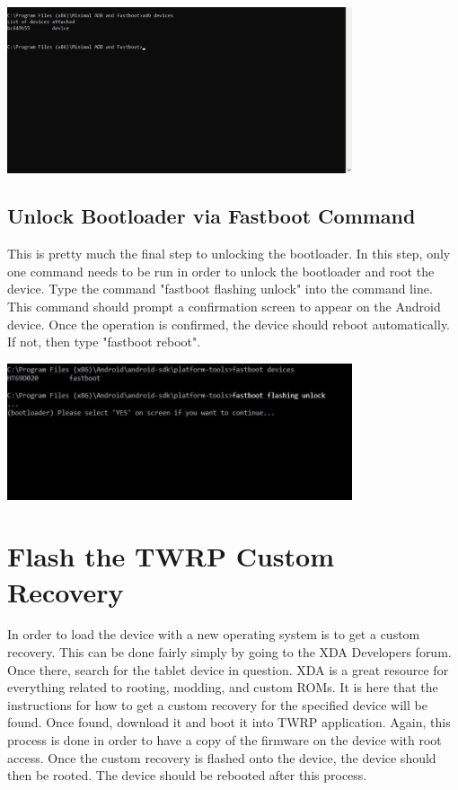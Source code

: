 \includegraphics[width=4in]{images/adbdevices}

\subsection{Unlock Bootloader via Fastboot Command}
This is pretty much the final step to unlocking the bootloader. In this step, only one command needs to be run in order to unlock the bootloader and root the device. 
Type the command "fastboot flashing unlock" into the command line. This command should prompt a confirmation screen to appear on the Android device. 
Once the operation is confirmed, the device should reboot automatically. If not, then type "fastboot reboot".

\includegraphics[width=4in]{images/fastboot}

\section{Flash the TWRP Custom Recovery}
In order to load the device with a new operating system is to get a custom recovery. This can be done fairly simply by going to the XDA Developers forum. 
Once there, search for the tablet device in question. XDA is a great resource for everything related to rooting, modding, and custom ROMs. It is here that 
the instructions for how to get a custom recovery for the specified device will be found. Once found, download it and boot it into TWRP application. Again, 
this process is done in order to have a copy of the firmware on the device with root access. Once the custom recovery is flashed onto the device, the device should 
then be rooted. The device should be rebooted after this process.

